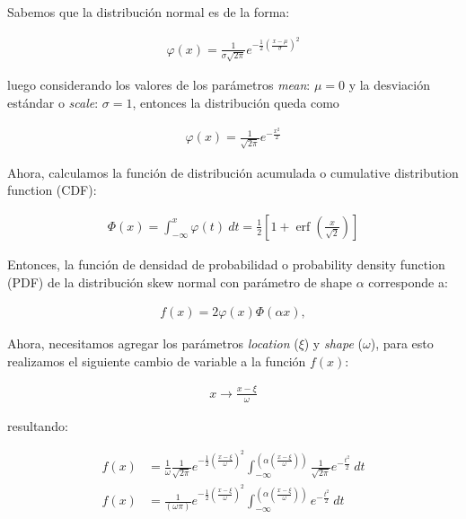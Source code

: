 \documentclass[11pt,letterpaper]{article}
\begin{document}
Sabemos que la distribución normal es de la forma:

\begin{align}
{\displaystyle \varphi(x)={\frac {1}{\sigma {\sqrt {2\pi }}}}e^{-{\frac {1}{2}}\left({\frac {x-\mu }{\sigma }}\right)^{2}}}
\end{align}

luego considerando los valores de los parámetros \textit{mean}: $\mu =0 $ y la desviación estándar o \textit{scale}: $\sigma=1$, entonces la distribución queda como 

\begin{align}
{\displaystyle \varphi(x)={\frac {1}{{\sqrt {2\pi }}}}e^{-\frac{x^2}{2}}}
\end{align}

Ahora, calculamos la función de distribución acumulada o cumulative distribution function (CDF):

\begin{align}
\Phi (x)=\int _{{-\infty }}^{{x}}\varphi (t)\ dt={\frac  {1}{2}}\left[1+\operatorname {erf}\left({\frac  {x}{{\sqrt  {2}}}}\right)\right]
\end{align}

Entonces, la función de densidad de probabilidad o probability density function (PDF) de la distribución skew normal con parámetro de shape $\alpha$ corresponde a:

\begin{align}
f(x)=2\varphi (x)\Phi (\alpha x),
\end{align}

Ahora, necesitamos agregar los parámetros \textit{location} ($\xi$) y \textit{shape} ($\omega$), para esto realizamos el siguiente cambio de variable a la función $f(x)$:

\begin{align}
x\rightarrow {\frac  {x-\xi }{\omega }}
\end{align}

resultando:

\begin{align}
f(x) &= \frac{1}{\omega}\frac{1}{\sqrt{2\pi}}e^{-\frac{1}{2}\left( \frac{x-\xi }{\omega }\right)^{2}} \int_{{-\infty }}^{\left(\alpha \left(\frac{x-\xi }{\omega } \right)\right)}\frac{1}{\sqrt{2\pi}}e^{-\frac{t^2}{2}}\ dt \nonumber \\
f(x) &= \frac{1}{(\omega \pi)}e^{-\frac{1}{2}\left( \frac{x-\xi }{\omega }\right)^{2}} \int_{{-\infty }}^{\left(\alpha \left(\frac{x-\xi }{\omega } \right)\right)}e^{-\frac{t^2}{2}}\ dt
\label{skew_normal_dist_mathdef}
\end{align}
\end{document}

